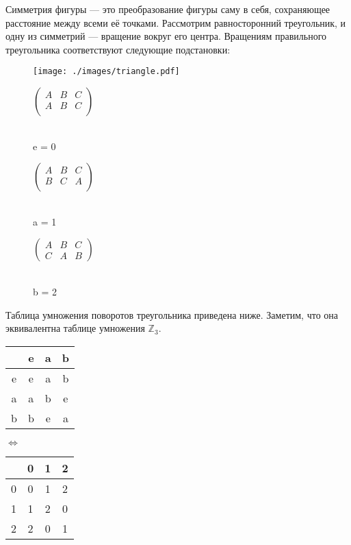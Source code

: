 \documentclass[12pt]{article}
\begin{document}
Симметрия фигуры --- это преобразование фигуры саму в себя, сохраняющее расстояние между всеми её точками. Рассмотрим равносторонний треугольник, и одну из симметрий --- вращение вокруг его центра. Вращениям правильного треугольника соответствуют следующие подстановки:

\begin{figure}[H]
  \centering
  \begin{minipage}{.2\textwidth}
    \centering
    \texttt{[image: ./images/triangle.pdf]}
  \end{minipage}
  \begin{minipage}{.2\textwidth}
    \centering
    $
    \left(\begin{array}{ccc}
      A & B & C \\
      A & B & C\\
    \end{array}\right)
    $

    \hrulefill\\
    e = 0
  \end{minipage}
  \;
  \begin{minipage}{.2\textwidth}
    \centering
    $
    \left(\begin{array}{ccc}
      A & B & C \\
      B & C & A\\
    \end{array}\right)
    $

    \hrulefill\\
    a = 1
  \end{minipage}
  \;
  \begin{minipage}{.2\textwidth}
    \centering
    $
    \left(\begin{array}{ccc}
      A & B & C \\
      C & A & B
    \end{array}\right)
    $

    \hrulefill\\
    b = 2
  \end{minipage}
\end{figure}

Таблица умножения поворотов треугольника приведена ниже. Заметим, что она эквивалентна таблице умножения $\mathbb{Z}_3$.

\begin{table}[H]
  \centering
  \begin{tabular}{ |c|*{3}{c}| }
    \hline
    & e & a & b\\
    \hline
    e & e & a & b\\
    a & a & b & e\\
    b & b & e & a\\
    \hline
  \end{tabular}
  $\Longleftrightarrow$
  \begin{tabular}{ |c|*{3}{c}| }
    \hline
    & 0 & 1 & 2\\
    \hline
    0 & 0 & 1 & 2\\
    1 & 1 & 2 & 0\\
    2 & 2 & 0 & 1\\
    \hline
  \end{tabular}
\end{table}
\end{document}
